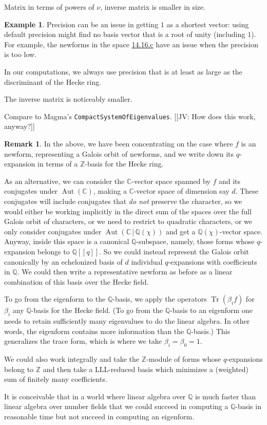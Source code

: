 \documentclass[11pt]{amsart}
\numberwithin{equation}{subsection}
\theoremstyle{plain}
\theoremstyle{definition}
\newtheorem{rmk}[equation]{Remark}
\newtheorem{exm}[equation]{Example}
\newcommand{\Q}{\mathbb{Q}}
\newcommand{\Z}{\mathbb{Z}}
\newcommand{\C}{\mathbb{C}}
\DeclareMathOperator{\Aut}{Aut}
\DeclareMathOperator{\Tr}{Tr}
\newcommand{\jv}[1]{{\color{red} \textsf{[[JV: #1]]}}}
\begin{document}
Matrix in terms of powers of $\nu$, inverse matrix is smaller in size.

\begin{exm}
Precision can be an issue in getting $1$ as a shortest vector: using default precision might find no basis vector that is a root of unity (including $1$).  For example, the newforms in the space \href{http://cmfs.lmfdb.xyz/ModularForm/GL2/Q/holomorphic/14/16/c/}{\textsf{14.16.c}} have an issue when the precision is too low.  

In our computations, we always use precision that is at least as large as the discriminant of the Hecke ring.  
\end{exm}

The inverse matrix is noticeably smaller.  

Compare to Magma's \texttt{CompactSystemOfEigenvalues}.  \jv{How does this work, anyway?}

\begin{rmk}
In the above, we have been concentrating on the case where $f$ is an newform, representing a Galois orbit of newforms, and we write down its $q$-expansion in terms of a $\Z$-basis for the Hecke ring.  

As an alternative, we can consider the $\C$-vector space spanned by $f$ and its conjugates under $\Aut(\C)$, making a $\C$-vector space of dimension say $d$.  These conjugates will include conjugates that \emph{do not} preserve the character, so we would either be working implicitly in the direct sum of the spaces over the full Galois orbit of characters, or we need to restrict to quadratic characters, or we only consider conjugates under $\Aut(\C\,|\,\Q(\chi))$ and get a $\Q(\chi)$-vector space.  Anyway, inside this space is a canonical $\Q$-subspace, namely, those forms whose $q$-expansion belongs to $\Q[[q]]$.  So we could instead represent the Galois orbit canonically by an echelonized basis of $d$ individual $q$-expansions with coefficients in $\Q$.  We could then write a representative newform as before as a linear combination of this basis over the Hecke field.

To go from the eigenform to the $\Q$-basis, we apply the operators $\Tr(\beta_i f)$ for $\beta_i$ any $\Q$-basis for the Hecke field.  (To go from the $\Q$-basis to an eigenform one needs to retain sufficiently many eigenvalues to do the linear algebra.  In other words, the eigenform contains more information than the $\Q$-basis.)  This generalizes the trace form, which is where we take $\beta_i=\beta_0=1$.  

We could also work integrally and take the $\Z$-module of forms whose $q$-expansions belong to $\Z$ and then take a LLL-reduced basis which minimizes a (weighted) sum of finitely many coefficients.  

It is conceivable that in a world where linear algebra over $\Q$ is much faster than linear algebra over number fields that we could succeed in computing a $\Q$-basis in reasonable time but not succeed in computing an eigenform.  
\end{rmk}
\end{document}
